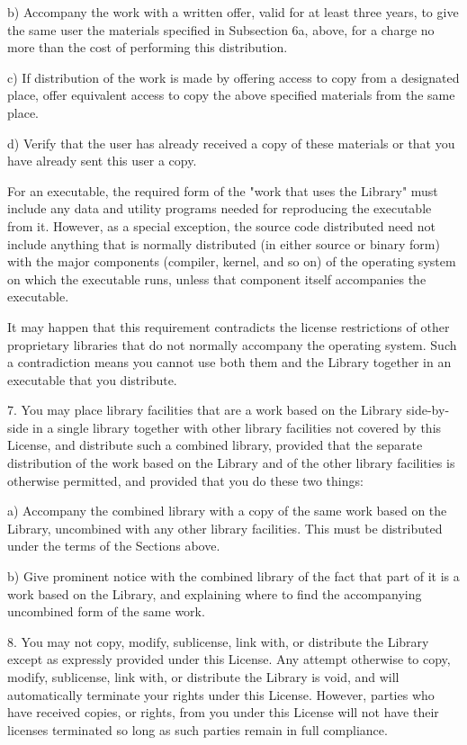 \documentclass[twoside]{tceusermanual}
\begin{document}
    b) Accompany the work with a written offer, valid for at
    least three years, to give the same user the materials
    specified in Subsection 6a, above, for a charge no more
    than the cost of performing this distribution.

    c) If distribution of the work is made by offering access to copy
    from a designated place, offer equivalent access to copy the above
    specified materials from the same place.

    d) Verify that the user has already received a copy of these
    materials or that you have already sent this user a copy.

For an executable, the required form of the "work that uses the
Library" must include any data and utility programs needed for
reproducing the executable from it.  However, as a special
exception, the source code distributed need not include anything
that is normally distributed (in either source or binary form)
with the major components (compiler, kernel, and so on) of the
operating system on which the executable runs, unless that
component itself accompanies the executable.

It may happen that this requirement contradicts the license
restrictions of other proprietary libraries that do not normally
accompany the operating system.  Such a contradiction means you
cannot use both them and the Library together in an executable
that you distribute.
 
7. You may place library facilities that are a work based on the
Library side-by-side in a single library together with other
library facilities not covered by this License, and distribute
such a combined library, provided that the separate distribution
of the work based on the Library and of the other library
facilities is otherwise permitted, and provided that you do
these two things:

    a) Accompany the combined library with a copy of the same work
    based on the Library, uncombined with any other library
    facilities.  This must be distributed under the terms of the
    Sections above.

    b) Give prominent notice with the combined library of the fact
    that part of it is a work based on the Library, and explaining
    where to find the accompanying uncombined form of the same work.

8. You may not copy, modify, sublicense, link with, or
distribute the Library except as expressly provided under this
License.  Any attempt otherwise to copy, modify, sublicense,
link with, or distribute the Library is void, and will
automatically terminate your rights under this License.
However, parties who have received copies, or rights, from you
under this License will not have their licenses terminated so
long as such parties remain in full compliance.
\end{document}
